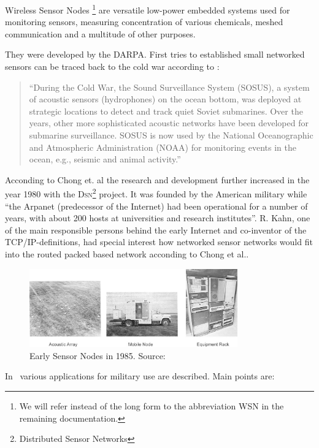 Wireless Sensor Nodes \footnote{We will refer instead of the long form to the abbreviation \textsc{WSN} in the remaining documentation.}
are versatile low-power embedded systems used for monitoring sensors, measuring concentration of various chemicals, meshed communication
and a multitude of other purposes.

They were developed by the DARPA\cite{Song}. First tries to established small networked sensors can be traced back to the cold war according to
\cite{Chong}:

\begin{quote}
    ``During the Cold War, the Sound Surveillance System
    (SOSUS), a system of acoustic sensors (hydrophones) on the
    ocean bottom, was deployed at strategic locations to detect
    and track quiet Soviet submarines. Over the years, other
    more sophisticated acoustic networks have been developed
    for submarine surveillance. SOSUS is now used by the
    National Oceanographic and Atmospheric Administration
    (NOAA) for monitoring events in the ocean, e.g., seismic
    and animal activity.''
\end{quote}

Acconding to Chong et. al the research and development further increased in the year 1980 with the \textsc{Dsn}\footnote{Distributed Sensor Networks} project.
It was founded by the American military while 
``the Arpanet (predecessor of the Internet) had been operational for a number of years, with 
about 200 hosts at universities and research institutes''\cite{Chong}.
R. Kahn, one of the main responsible persons behind the early Internet and co-inventor of the TCP/IP-definitions, had special interest how networked
sensor networks would fit into the routed packed based network acconding to Chong et al..

\begin{figure}[H]
   \centering
   \includegraphics[width=0.8\textwidth]{pic/earlynode.png}%
   \caption{Early Sensor Nodes in 1985. Source: \cite{Chong}}
   \label{earlynode}%
\end{figure}

In~\cite{Akyildiz02wirelesssensor} various applications for military use are described. Main points are:

